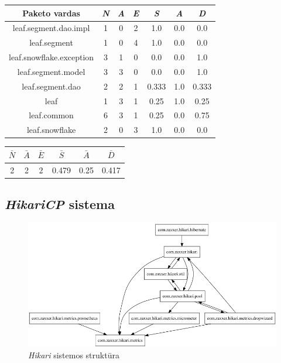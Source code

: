 
\begin{center}
    \begin{tabular}{|c|c|c|c|c|c|c|}
        \hline
        Paketo vardas & \textit{N} & \textit{A} & \textit{E} & \textit{S} & \textit{A} & \textit{D} \\ [0.5ex]
        \hline\hline
        leaf.segment.dao.impl & 1 & 0 & 2 & 1.0 & 0.0 & 0.0 \\
        \hline
        leaf.segment & 1 & 0 & 4 & 1.0 & 0.0 & 0.0 \\
        \hline
        leaf.snowflake.exception & 3 & 1 & 0 & 0.0 & 0.0 & 1.0 \\
        \hline
        leaf.segment.model & 3 & 3 & 0 & 0.0 & 0.0 & 1.0 \\
        \hline
        leaf.segment.dao & 2 & 2 & 1 & 0.333 & 1.0 & 0.333 \\
        \hline
        leaf & 1 & 3 & 1 & 0.25 & 1.0 & 0.25 \\
        \hline
        leaf.common & 6 & 3 & 1 & 0.25 & 0.0 & 0.75 \\
        \hline
        leaf.snowflake & 2 & 0 & 3 & 1.0 & 0.0 & 0.0 \\
        \hline
    \end{tabular}
    \begin{tabular}{|c|c|c|c|c|c|}
        \hline
        $\bar{N}$ & $\bar{A}$ & $\bar{E}$ & $\bar{S}$ & $\bar{A}$ & $\bar{D}$ \\ [0.5ex]
        \hline\hline
        2 & 2 & 2 & 0.479 & 0.25 & 0.417 \\
        \hline
    \end{tabular}
\end{center}


\subsection{\textit{HikariCP} sistema}

\begin{figure}[H]
    \centering
    \includegraphics[scale=0.5]{img/hikari_packages_orig}
    \caption{\textit{Hikari} sistemos struktūra}
    \label{img:hikari_packages_orig}
\end{figure}


